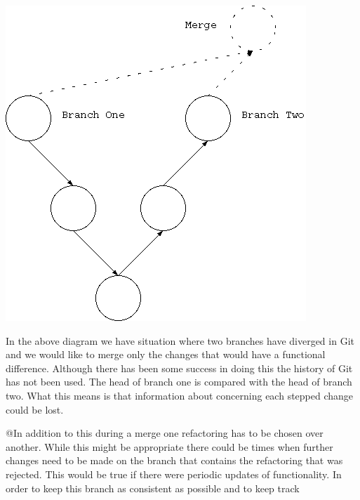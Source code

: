 \documentclass[12pt]{CRPITStyle}
\begin{document}
\begin{center}
\includegraphics[scale=0.5]{git-diag}
\end{center}

In the above diagram we have situation where two branches have diverged in Git and we would like to merge only the changes that would have a functional difference. Although there has been some success in doing this the history of Git has not been used. The head of branch one is compared with the head of branch two. What this means is that information about concerning each stepped change could be lost. 

@In addition to this during a merge one refactoring has to be chosen over another. While this might be appropriate there could be times when further changes need to be made on the branch that contains the refactoring that was rejected. This would be true if there were periodic updates of functionality. In order to keep this branch as consistent as possible and to keep track
\end{document}
